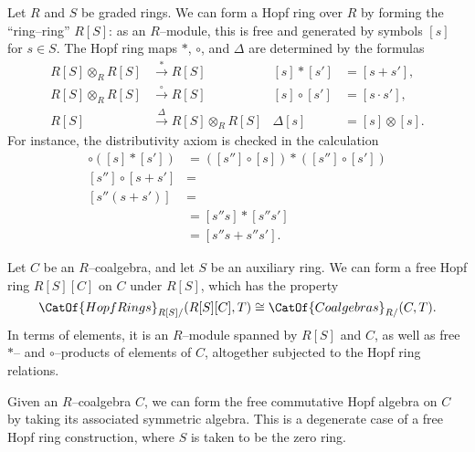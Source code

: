 \begin{definition}
Let $R$ and $S$ be graded rings.  We can form a Hopf ring over $R$ by forming the ``ring--ring'' $R[S]$: as an $R$--module, this is free and generated by symbols $[s]$ for $s \in S$.  The Hopf ring maps $\ast$, $\circ$, and $\Delta$ are determined by the formulas
\begin{align*}
R[S] \otimes_R R[S] & \xrightarrow{\ast} R[S] & [s] \ast [s'] & = [s + s'], \\
R[S] \otimes_R R[S] & \xrightarrow{\circ} R[S] & [s] \circ [s'] & = [s \cdot s'], \\
R[S] & \xrightarrow{\Delta} R[S] \otimes_R R[S] & \Delta [s] & = [s] \otimes [s].
\end{align*}
For instance, the distributivity axiom is checked in the calculation
\begin{align*}
[s''] \circ ([s] \ast [s']) & = ([s''] \circ [s]) \ast ([s''] \circ [s']) \\
[s''] \circ [s + s'] & = \\
[s''(s + s')] & = \\
& = [s'' s] \ast [s'' s'] \\
& = [s'' s + s'' s'].
\end{align*}
\end{definition}

\begin{definition}
Let $C$ be an $R$--coalgebra, and let $S$ be an auxiliary ring.  We can form a free Hopf ring $R[S][C]$ on $C$ under $R[S]$, which has the property \[\CatOf{HopfRings}_{R[S]/}(R[S][C], T) \cong \CatOf{Coalgebras}_{R/}(C, T).\]  In terms of elements, it is an $R$--module spanned by $R[S]$ and $C$, as well as free $\ast$-- and $\circ$--products of elements of $C$, altogether subjected to the Hopf ring relations.
\end{definition}

\begin{remark}
Given an $R$--coalgebra $C$, we can form the free commutative Hopf algebra on $C$ by taking its associated symmetric algebra.  This is a degenerate case of a free Hopf ring construction, where $S$ is taken to be the zero ring.
\end{remark}

